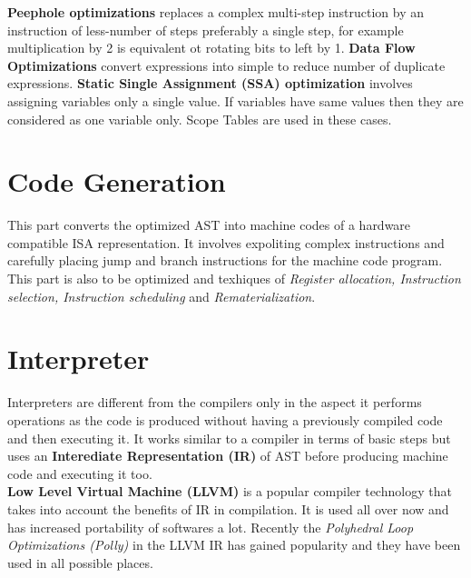 \textbf{Peephole optimizations} replaces a complex multi-step instruction by an instruction of less-number of steps preferably a single step, for example multiplication by 2 is equivalent ot rotating bits to left by 1. \textbf{Data Flow Optimizations} convert expressions into simple to reduce number of duplicate expressions. \textbf{Static Single Assignment (SSA) optimization} involves assigning variables only a single value. If variables have same values then they are considered as one variable only. Scope Tables are used in these cases.

\section{Code Generation}
This part converts the optimized AST into machine codes of a hardware compatible ISA representation. It involves expoliting complex instructions and carefully placing jump and branch instructions for the machine code program. This part is also to be optimized and texhiques of \textit{Register allocation, Instruction selection, Instruction scheduling} and \textit{Rematerialization}. 

\section{Interpreter}
Interpreters are different from the compilers only in the aspect it performs operations as the code is produced without having a previously compiled code and then executing it. It works similar to a compiler in terms of basic steps but uses an \textbf{Interediate Representation (IR)} of AST before producing machine code and executing it too.\\

\textbf{Low Level Virtual Machine (LLVM)}\cite{llvm} is a popular compiler technology that takes into account the benefits of IR in compilation. It is used all over now and has increased portability of softwares a lot. Recently the \textit{Polyhedral Loop Optimizations (Polly)} in the LLVM IR has gained popularity and they have been used in all possible places.\\

